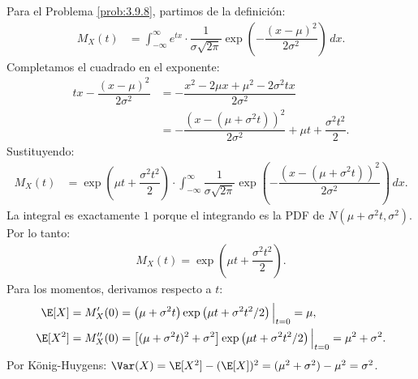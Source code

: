 \begin{solucion}
	\label{sol:3.9.8}
	Para el Problema \ref{prob:3.9.8}, partimos de la definición:
	\begin{align*}
		M_{X}(t) &= \int_{-\infty}^{\infty} e^{tx} \cdot \dfrac{1}{\sigma\sqrt{2\pi}} \exp\left(-\dfrac{(x-\mu)^{2}}{2\sigma^{2}}\right)\,dx.
		\end{align*}
		Completamos el cuadrado en el exponente:
		\begin{align*}
			tx - \dfrac{(x-\mu)^{2}}{2\sigma^{2}} &= -\dfrac{x^{2} - 2\mu x + \mu^{2} - 2\sigma^{2}tx}{2\sigma^{2}} \\
			&= -\dfrac{(x - (\mu + \sigma^{2}t))^{2}}{2\sigma^{2}} + \mu t + \dfrac{\sigma^{2}t^{2}}{2}.
		\end{align*}
		Sustituyendo:
		\begin{align*}
			M_{X}(t) &= \exp\left(\mu t + \dfrac{\sigma^{2}t^{2}}{2}\right) \cdot \int_{-\infty}^{\infty} \dfrac{1}{\sigma\sqrt{2\pi}} \exp\left(-\dfrac{(x - (\mu + \sigma^{2}t))^{2}}{2\sigma^{2}}\right)\,dx.
		\end{align*}
		La integral es exactamente $1$ porque el integrando es la PDF de $N(\mu + \sigma^{2}t, \sigma^{2})$. Por lo tanto:
		\begin{align*}
			M_{X}(t) = \exp\left(\mu t + \dfrac{\sigma^{2}t^{2}}{2}\right).
		\end{align*}
		Para los momentos, derivamos respecto a $t$:
		\begin{align*}
			\E[X] &= M_{X}'(0) = \left(\mu + \sigma^{2}t\right) \exp\left(\mu t + \sigma^{2}t^{2}/2\right)\Big|_{t=0} = \mu, \\
			\E[X^{2}] &= M_{X}''(0) = \left[(\mu + \sigma^{2}t)^{2} + \sigma^{2}\right] \exp\left(\mu t + \sigma^{2}t^{2}/2\right)\Big|_{t=0} = \mu^{2} + \sigma^{2}.
		\end{align*}
		Por König-Huygens: $\Var(X) = \E[X^{2}] - (\E[X])^{2} = (\mu^{2} + \sigma^{2}) - \mu^{2} = \sigma^{2}$. \qedhere
\end{solucion}

